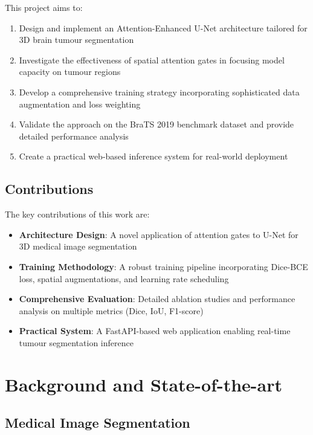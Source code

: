 \documentclass{ecsproject}     %
\begin{document}
This project aims to:
\begin{enumerate}
    \item Design and implement an Attention-Enhanced U-Net architecture tailored for 3D brain tumour segmentation
    \item Investigate the effectiveness of spatial attention gates in focusing model capacity on tumour regions
    \item Develop a comprehensive training strategy incorporating sophisticated data augmentation and loss weighting
    \item Validate the approach on the BraTS 2019 benchmark dataset and provide detailed performance analysis
    \item Create a practical web-based inference system for real-world deployment
\end{enumerate}

\section{Contributions}

The key contributions of this work are:

\begin{itemize}
    \item \textbf{Architecture Design}: A novel application of attention gates to U-Net for 3D medical image segmentation
    \item \textbf{Training Methodology}: A robust training pipeline incorporating Dice-BCE loss, spatial augmentations, and learning rate scheduling
    \item \textbf{Comprehensive Evaluation}: Detailed ablation studies and performance analysis on multiple metrics (Dice, IoU, F1-score)
    \item \textbf{Practical System}: A FastAPI-based web application enabling real-time tumour segmentation inference
\end{itemize}


\chapter{Background and State-of-the-art} \label{Chapter:Background}

\section{Medical Image Segmentation}
\end{document}
